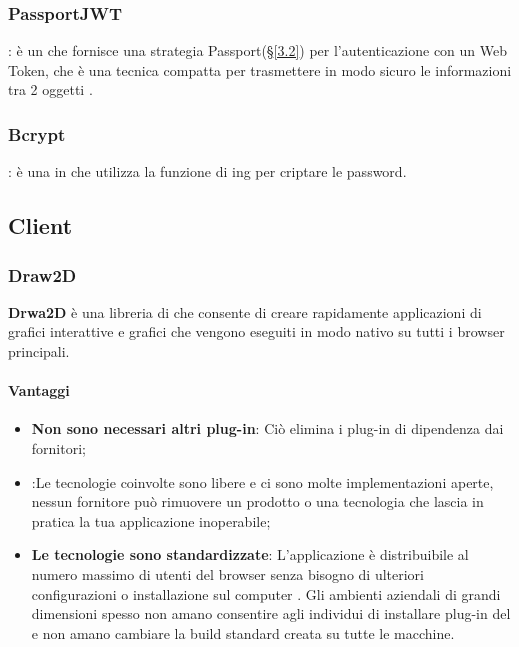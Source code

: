 	\subsubsection{PassportJWT}: è un  che fornisce una strategia Passport(\S\ref{3.2}) per l'autenticazione con un  Web Token, che è una tecnica compatta per trasmettere in modo sicuro le informazioni tra 2 oggetti .

	\subsubsection{Bcrypt}: è una  in  che utilizza la funzione di ing per criptare le password.

\subsection{Client}

	\subsubsection{Draw2D}
	\textbf{Drwa2D} è una libreria  di  che consente di creare rapidamente applicazioni di grafici interattive e grafici che vengono eseguiti in modo nativo su tutti i browser principali.

\paragraph{Vantaggi}
\begin{itemize}
\item \textbf{Non sono necessari altri plug-in}: Ciò elimina i plug-in di dipendenza dai fornitori;
\item \textbf{}:Le tecnologie coinvolte sono libere e ci sono molte implementazioni aperte, nessun fornitore può rimuovere un prodotto o una tecnologia che lascia in pratica la tua applicazione inoperabile;
\item \textbf{Le tecnologie sono standardizzate}: L'applicazione è distribuibile al numero massimo di utenti del browser senza bisogno di ulteriori configurazioni o installazione sul computer . Gli ambienti aziendali di grandi dimensioni spesso non amano consentire agli individui di installare plug-in del  e non amano cambiare la build standard creata su tutte le macchine.
\end{itemize}

